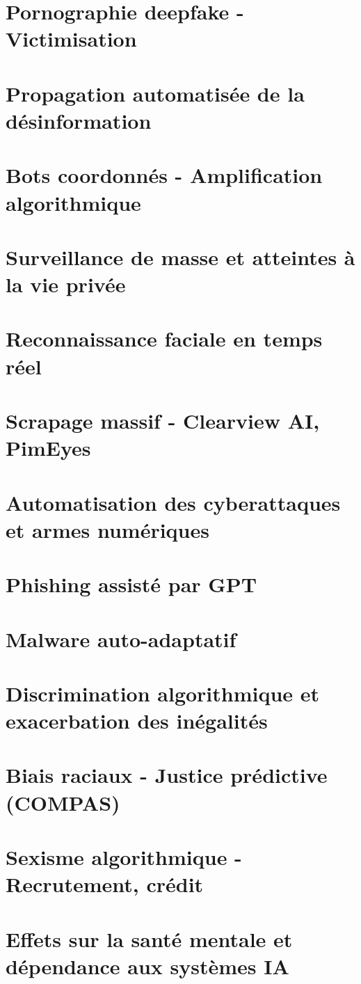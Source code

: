 \documentclass[12pt,a4paper]{book}
\begin{document}
\section{Pornographie deepfake - Victimisation}
\section{Propagation automatisée de la désinformation}
\section{Bots coordonnés - Amplification algorithmique}
\section{Surveillance de masse et atteintes à la vie privée}
\section{Reconnaissance faciale en temps réel}
\section{Scrapage massif - Clearview AI, PimEyes}
\section{Automatisation des cyberattaques et armes numériques}
\section{Phishing assisté par GPT}
\section{Malware auto-adaptatif}
\section{Discrimination algorithmique et exacerbation des inégalités}
\section{Biais raciaux - Justice prédictive (COMPAS)}
\section{Sexisme algorithmique - Recrutement, crédit}
\section{Effets sur la santé mentale et dépendance aux systèmes IA}
\end{document}
